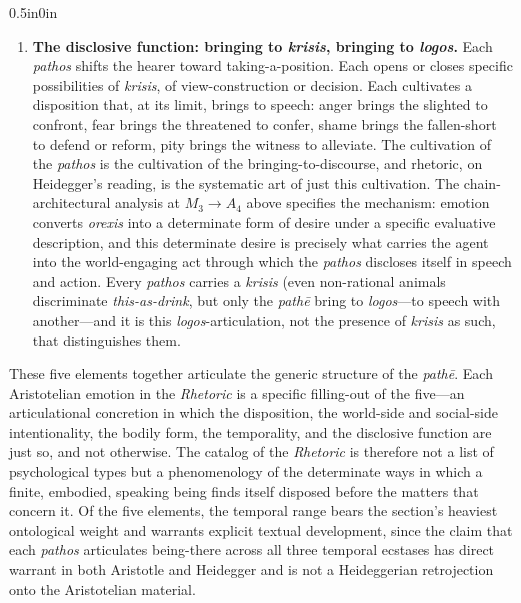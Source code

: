 \begin{adjustwidth}{0.5in}{0in}
\begin{enumerate}
        \item \textbf{The disclosive function: bringing to \textit{krisis}, bringing to \textit{logos}.} Each \textit{pathos} shifts the hearer toward taking-a-position. Each opens or closes specific possibilities of \textit{krisis}, of view-construction or decision. Each cultivates a disposition that, at its limit, brings to speech: anger brings the slighted to confront, fear brings the threatened to confer, shame brings the fallen-short to defend or reform, pity brings the witness to alleviate. The cultivation of the \textit{pathos} is the cultivation of the bringing-to-discourse, and rhetoric, on Heidegger's reading, is the systematic art of just this cultivation. The chain-architectural analysis at $M_3 \rightarrow A_4$ above specifies the mechanism: emotion converts \textit{orexis} into a determinate form of desire under a specific evaluative description, and this determinate desire is precisely what carries the agent into the world-engaging act through which the \textit{pathos} discloses itself in speech and action. Every \textit{pathos} carries a \textit{krisis} (even non-rational animals discriminate \textit{this-as-drink}, but only the \textit{pathē} bring to \textit{logos}---to speech with another---and it is this \textit{logos}-articulation, not the presence of \textit{krisis} as such, that distinguishes them.
    \end{enumerate}
\end{adjustwidth}

These five elements together articulate the generic structure of the \textit{pathē}. Each Aristotelian emotion in the \textit{Rhetoric} is a specific filling-out of the five---an articulational concretion in which the disposition, the world-side and social-side intentionality, the bodily form, the temporality, and the disclosive function are just so, and not otherwise. The catalog of the \textit{Rhetoric} is therefore not a list of psychological types but a phenomenology of the determinate ways in which a finite, embodied, speaking being finds itself disposed before the matters that concern it. Of the five elements, the temporal range bears the section's heaviest ontological weight and warrants explicit textual development, since the claim that each \textit{pathos} articulates being-there across all three temporal ecstases has direct warrant in both Aristotle and Heidegger and is not a Heideggerian retrojection onto the Aristotelian material.

